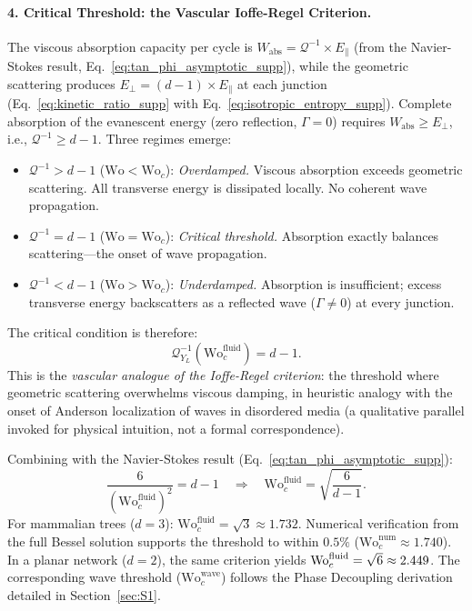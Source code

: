 \documentclass[11pt,a4paper]{article}
\theoremstyle{remark}
\begin{document}
\paragraph{4. Critical Threshold: the Vascular Ioffe-Regel Criterion.}
The viscous absorption capacity per cycle is $W_{\mathrm{abs}} =
\mathcal{Q}^{-1} \times E_\parallel$ (from the Navier-Stokes result,
Eq.~\eqref{eq:tan_phi_asymptotic_supp}), while the geometric scattering produces
$E_\perp = (d-1) \times E_\parallel$ at each junction
(Eq.~\eqref{eq:kinetic_ratio_supp} with Eq.~\eqref{eq:isotropic_entropy_supp}).
Complete absorption of the evanescent energy (zero reflection, $\Gamma = 0$)
requires $W_{\mathrm{abs}} \geq E_\perp$, i.e., $\mathcal{Q}^{-1} \geq d-1$.
Three regimes emerge:
\begin{itemize}
\item
$\mathcal{Q}^{-1} > d-1$ ($\mathrm{Wo} < \mathrm{Wo}_c$): \emph{Overdamped.}
Viscous absorption exceeds geometric scattering. All transverse energy is
dissipated locally. No coherent wave propagation.
\item
$\mathcal{Q}^{-1} = d-1$ ($\mathrm{Wo} = \mathrm{Wo}_c$): \emph{Critical
threshold.} Absorption exactly balances scattering---the onset of wave
propagation.
\item
$\mathcal{Q}^{-1} < d-1$ ($\mathrm{Wo} > \mathrm{Wo}_c$): \emph{Underdamped.}
Absorption is insufficient; excess transverse energy backscatters as a reflected
wave ($\Gamma \neq 0$) at every junction.
\end{itemize}
The critical condition is therefore:
\begin{equation}\label{eq:self_consistency_supp}
    \mathcal{Q}^{-1}_{Y_L}(\mathrm{Wo}_c^{\mathrm{fluid}}) = d - 1.
\end{equation}
This is the \emph{vascular analogue of the Ioffe-Regel criterion}: the threshold
where geometric scattering overwhelms viscous damping, in heuristic analogy
with the onset of Anderson localization of waves in disordered media (a
qualitative parallel invoked for physical intuition, not a formal
correspondence).

Combining with the Navier-Stokes result
(Eq.~\eqref{eq:tan_phi_asymptotic_supp}):
\begin{equation}\label{eq:woc_derivation_supp}
    \frac{6}{(\mathrm{Wo}_c^{\mathrm{fluid}})^2} = d - 1 \quad \Rightarrow \quad \mathrm{Wo}_c^{\mathrm{fluid}} = \sqrt{\frac{6}{d-1}}.
\end{equation}
For mammalian trees ($d=3$): $\mathrm{Wo}_c^{\mathrm{fluid}} = \sqrt{3} \approx
1.732$. Numerical verification from the full Bessel solution supports the
threshold to within $0.5\%$ ($\mathrm{Wo}_c^{\mathrm{num}} \approx 1.740$). In a
planar network ($d=2$), the same criterion yields
$\mathrm{Wo}_c^{\mathrm{fluid}} = \sqrt{6} \approx 2.449$. The
corresponding wave threshold ($\mathrm{Wo}_c^{\mathrm{wave}}$) follows the Phase
Decoupling derivation detailed in Section~\ref{sec:S1}.
\end{document}
